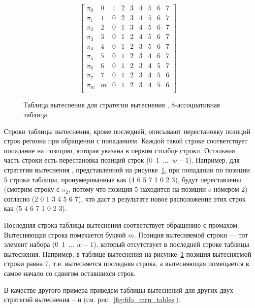 \begin{figure}[h]
$$ \left[
     \begin{array}{c|cccccccc}
       \pi_0 & 0 & 1 & 2 & 3 & 4 & 5 & 6 & 7 \\
       \pi_1 & 1 & 0 & 2 & 3 & 4 & 5 & 6 & 7 \\
       \pi_2 & 2 & 0 & 1 & 3 & 4 & 5 & 6 & 7 \\
       \pi_3 & 3 & 0 & 1 & 2 & 4 & 5 & 6 & 7 \\
       \pi_4 & 4 & 0 & 1 & 2 & 3 & 5 & 6 & 7 \\
       \pi_5 & 5 & 0 & 1 & 2 & 3 & 4 & 6 & 7 \\
       \pi_6 & 6 & 0 & 1 & 2 & 3 & 4 & 5 & 7 \\
       \pi_7 & 7 & 0 & 1 & 2 & 3 & 4 & 5 & 6 \\
       \pi_m & m & 0 & 1 & 2 & 3 & 4 & 5 & 6 \\
     \end{array}
   \right]
$$
\caption{Таблица вытеснения для стратегии вытеснения \LRU,
8-ассоциативная таблица}\label{fig:PolicyTableLRU8}
\end{figure}

Строки таблицы вытеснения, кроме последней, описывают перестановку позиций строк
региона при обращении с попаданием. Каждой такой строке соответствует попадание
на позицию, которая указана в первом столбце строки. Остальная часть строки есть
перестановка позиций строк (0~1~...~$w{-}1$). Например, для стратегии вытеснения
\LRU,
представленной на рисунке~\ref{fig:PolicyTableLRU8}, при попадании по позиции 5
строки таблицы, пронумерованные как (4 6 5 7 1 0 2 3), будут переставлены
(смотрим строку с $\pi_2$, потому что позиция 5 находится на позиции c номером
2) согласно (2 0 1 3 4 5 6 7), что даст в результате новое расположение этих
строк как (5 4 6 7 1 0 2 3).

Последняя строка таблицы вытеснения соответствует обращению с промахом.
Вытесняющая строка помечается буквой $m$. Позиция вытесняемой строки --- тот
элемент набора (0~1~... $w{-}1$), который отсутствует в последней строке таблицы
вытеснения. Например, в таблице вытеснения на рисунке~\ref{fig:PolicyTableLRU8}
позиция вытесняемой строки равна 7, т.е. вытесняется последняя строка, а
вытесняющая помещается в самое начало со сдвигом оставшихся строк.

В качестве другого примера приведем таблицы вытеснений для других двух стратегий
вытеснения -- \FIFO и \MRU (см. рис.~\ref{fig:fifo_mru_tables}).


